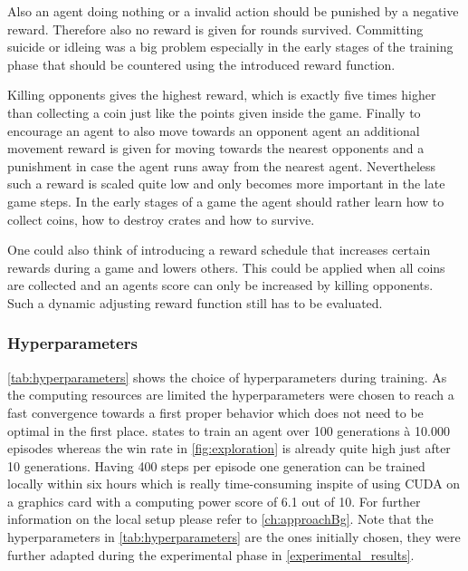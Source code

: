 Also an agent doing nothing or a invalid action should be punished by a negative reward. Therefore also no reward is given for rounds survived. Committing suicide or idleing was a big problem especially in the early stages of the training phase that should be countered using the introduced reward function. 

Killing opponents gives the highest reward, which is exactly five times higher than collecting a coin just like the points given inside the game. Finally to encourage an agent to also move towards an opponent agent an additional movement reward is given for moving towards the nearest opponents and a punishment in case the agent runs away from the nearest agent. Nevertheless such a reward is scaled quite low and only becomes more important in the late game steps. In the early stages of a game the agent should rather learn how to collect coins, how to destroy crates and how to survive. 

One could also think of introducing a reward schedule that increases certain rewards during a game and lowers others. This could be applied when all coins are collected and an agents score can only be increased by killing opponents. Such a dynamic adjusting reward function still has to be evaluated.

\subsubsection{Hyperparameters}
\label{ch:approachBe}

\autoref{tab:hyperparameters} shows the choice of hyperparameters during training. As the computing resources are limited the hyperparameters were chosen to reach a fast convergence towards a first proper behavior which does not need to be optimal in the first place. \cite{Kormelink2018} states to train an agent over 100 generations à 10.000 episodes whereas the win rate in \autoref{fig:exploration} is already quite high just after 10 generations. Having 400 steps per episode one generation can be trained locally within six hours which is really time-consuming inspite of using CUDA on a graphics card with a computing power score of 6.1 out of 10. For further information on the local setup please refer to \autoref{ch:approachBg}. Note that the hyperparameters in \autoref{tab:hyperparameters} are the ones initially chosen, they were further adapted during the experimental phase in \autoref{experimental_results}.


